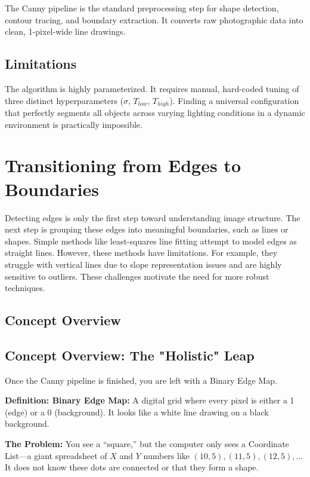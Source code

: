 \documentclass[12pt]{article}
\begin{document}
The Canny pipeline is the standard preprocessing step for shape detection, contour tracing, and boundary extraction. It converts raw photographic data into clean, 1-pixel-wide line drawings.

\subsection{Limitations}

The algorithm is highly parameterized. It requires manual, hard-coded tuning of three distinct hyperparameters ($\sigma$, $T_{low}$, $T_{high}$). Finding a universal configuration that perfectly segments all objects across varying lighting conditions in a dynamic environment is practically impossible.


\section{Transitioning from Edges to Boundaries}
Detecting edges is only the first step toward understanding image structure. The next step is grouping these edges into meaningful boundaries, such as lines or shapes. Simple methods like least-squares line fitting attempt to model edges as straight lines. However, these methods have limitations. For example, they struggle with vertical lines due to slope representation issues and are highly sensitive to outliers. These challenges motivate the need for more robust techniques.

\subsection{Concept Overview}

\subsection{Concept Overview: The "Holistic" Leap}

Once the Canny pipeline is finished, you are left with a Binary Edge Map.

\textbf{Definition: Binary Edge Map:}
A digital grid where every pixel is either a 1 (edge) or a 0 (background). It looks like a white line drawing on a black background.

\textbf{The Problem:}
You see a ``square,'' but the computer only sees a Coordinate List—a giant spreadsheet of $X$ and $Y$ numbers like $(10, 5), (11, 5), (12, 5), \dots$
It does not know these dots are connected or that they form a shape.
\end{document}
